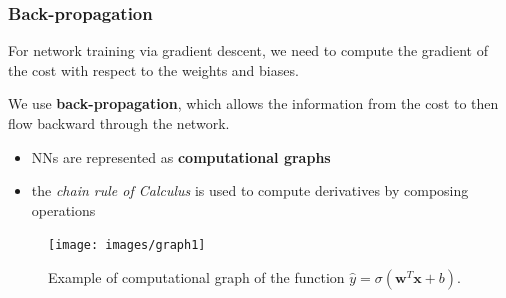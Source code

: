 \documentclass{beamer}
\begin{document}
	\begin{frame}
		\frametitle{Back-propagation}
		For network training via gradient descent, we need to compute the gradient of the cost with respect to the weights and biases.
		
		We use \textbf{back-propagation}, which allows the information from the cost to then ﬂow backward through the network.
		
		\begin{itemize}
			\item NNs are represented as \textbf{computational graphs}
			\item the \textit{chain rule of Calculus} is used to compute derivatives by composing operations
		\end{itemize}
		
		\begin{figure}
			\centering
			\texttt{[image: images/graph1]}
			\caption{Example of computational graph of the function $\hat{y} = \sigma(\bm{w}^T\bm{x}+b)$.}
		\end{figure}
	\end{frame}
\end{document}
